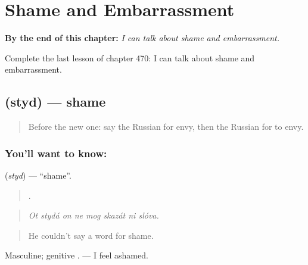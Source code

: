 
\chapter{Shame and Embarrassment}
\label{ch:ru-shame-and-embarrassment}

\begin{chapteropening}
\textbf{By the end of this chapter:} \emph{I can talk about shame and embarrassment.}

Complete the last lesson of chapter 470: I can talk about shame and embarrassment.
\end{chapteropening}

\section[\texorpdfstring{\ru{стыд} (styd)}{стыд (styd)}]{ (styd) — shame}

\label{lesson:RU-C470-styd}



\begin{quote}
Before the new one: say the Russian for envy, then the Russian for to envy.
\end{quote}

\subsection*{You'll want to know: }
\textbf{} (\emph{styd}) — \textquotedblleft{}shame\textquotedblright{}.

\begin{quote}
       .
\end{quote}

\begin{quote}
\emph{Ot stydá on ne mog skazát ni slóva.}
\end{quote}

\begin{quote}
He couldn't say a word for shame.
\end{quote}

Masculine; genitive . \emph{ } — I feel ashamed.


